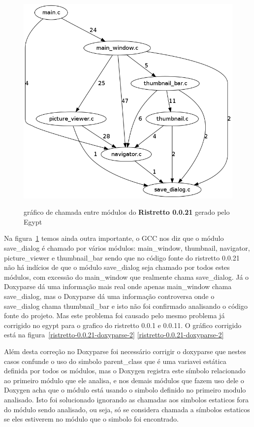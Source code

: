 \begin{figure}
{   \includegraphics[scale=0.5]{imagens/ristretto-0_0_21-gcc}
}
\caption{gráfico de chamada entre módulos do {\bf Ristretto 0.0.21} gerado pelo Egypt}
\label{ristretto-0.0.21}
\end{figure}

Na figura~\ref{ristretto-0.0.21} temos ainda outra importante, o GCC nos diz
que o módulo save\_dialog é chamado por vários módulos: main\_window,
thumbnail, navigator, picture\_viewer e thumbnail\_bar sendo que no código
fonte do ristretto 0.0.21 não há indícios de que o módulo save\_dialog seja chamado por todos estes módulos,
com excessão do main\_window que realmente chama save\_dialog. Já o Doxyparse dá uma informação mais real onde apenas main\_window chama save\_dialog, mas o Doxyparse dá uma informação controversa onde o save\_dialog chama
thumbnail\_bar e isto não foi confirmado analisando o código fonte do projeto. Mas este problema foi causado pelo mesmo problema já corrigido no egypt para o grafico do ristretto 0.0.1 e 0.0.11. O gráfico corrigido está na figura~\ref{ristretto-0.0.21-doxyparse-2} \ref{ristretto-0.0.21-doxyparse-2}

Além desta correção no Doxyparse foi necessário corrigir o doxyparse
que nestes casos confunde o uso do simbolo parent\_class que é uma variavei estática definida
por todos os módulos, mas o Doxygen registra este símbolo relacionado ao
primeiro módulo que ele analisa, e nos demais módulos que fazem uso dele o
Doxygen acha que o módulo está usando o simbolo definido no primeiro modulo
analisado. Isto foi solucionado ignorando as chamadas aos simbolos estaticos
fora do módulo sendo analisado, ou seja, só se considera chamada a símbolos
estaticos se eles estiverem no módulo que o simbolo foi encontrado.

